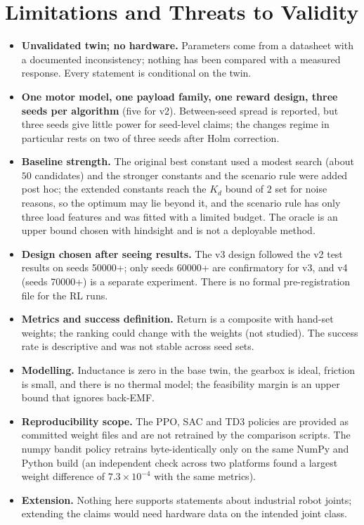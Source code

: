 \section{Limitations and Threats to Validity}
\begin{itemize}
\item \textbf{Unvalidated twin; no hardware.} Parameters come from a datasheet with a documented inconsistency; nothing has been compared with a measured response. Every statement is conditional on the twin.
\item \textbf{One motor model, one payload family, one reward design, three seeds per algorithm} (five for v2). Between-seed spread is reported, but three seeds give little power for seed-level claims; the changes regime in particular rests on two of three seeds after Holm correction.
\item \textbf{Baseline strength.} The original best constant used a modest search (about $50$ candidates) and the stronger constants and the scenario rule were added post hoc; the extended constants reach the $K_d$ bound of $2$ set for noise reasons, so the optimum may lie beyond it, and the scenario rule has only three load features and was fitted with a limited budget. The oracle is an upper bound chosen with hindsight and is not a deployable method.
\item \textbf{Design chosen after seeing results.} The v3 design followed the v2 test results on seeds 50000+; only seeds 60000+ are confirmatory for v3, and v4 (seeds 70000+) is a separate experiment. There is no formal pre-registration file for the RL runs.
\item \textbf{Metrics and success definition.} Return is a composite with hand-set weights; the ranking could change with the weights (not studied). The success rate is descriptive and was not stable across seed sets.
\item \textbf{Modelling.} Inductance is zero in the base twin, the gearbox is ideal, friction is small, and there is no thermal model; the feasibility margin is an upper bound that ignores back-EMF.
\item \textbf{Reproducibility scope.} The PPO, SAC and TD3 policies are provided as committed weight files and are not retrained by the comparison scripts. The numpy bandit policy retrains byte-identically only on the same NumPy and Python build (an independent check across two platforms found a largest weight difference of $7.3\times10^{-4}$ with the same metrics).
\item \textbf{Extension.} Nothing here supports statements about industrial robot joints; extending the claims would need hardware data on the intended joint class.
\end{itemize}
